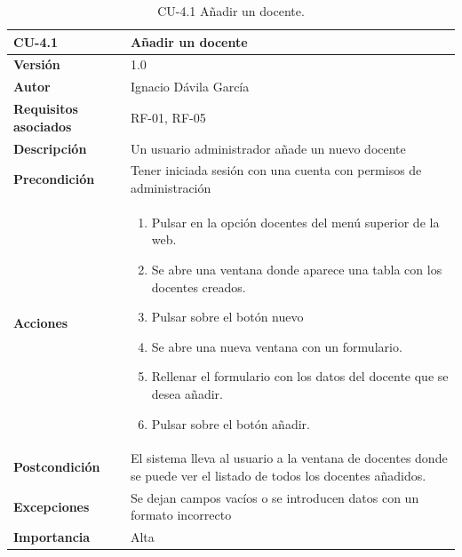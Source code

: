 \begin{table}[p]
	\centering
	\begin{tabularx}{\linewidth}{ p{} p{} }
		\toprule
		\textbf{CU-4.1}    & \textbf{Añadir un docente}\\
		\toprule
		\textbf{Versión}              & 1.0    \\
		\textbf{Autor}                & Ignacio Dávila García \\
		\textbf{Requisitos asociados} & RF-01, RF-05 \\
		\textbf{Descripción}          & Un usuario administrador añade un nuevo docente \\
		\textbf{Precondición}         & Tener iniciada sesión con una cuenta con permisos de administración \\
		\textbf{Acciones}             &
		\begin{enumerate}
			\def\labelenumi{\arabic{enumi}.}
			\tightlist
			\item Pulsar en la opción docentes del menú superior de la web.
			\item Se abre una ventana donde aparece una tabla con los docentes creados.
			\item Pulsar sobre el botón nuevo
			\item Se abre una nueva ventana con un formulario.
			\item Rellenar el formulario con los datos del docente que se desea añadir.
			\item Pulsar sobre el botón añadir.
		\end{enumerate}\\
		\textbf{Postcondición}        & El sistema lleva al usuario a la ventana de docentes donde se puede ver el listado de todos los docentes añadidos. \\
		\textbf{Excepciones}          & Se dejan campos vacíos o se introducen datos con un formato incorrecto \\
		\textbf{Importancia}          & Alta \\
		\bottomrule
	\end{tabularx}
	\caption{CU-4.1 Añadir un docente.}
\end{table}

